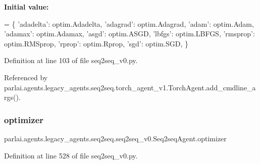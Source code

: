 {\bfseries Initial value\+:}
\begin{DoxyCode}
=  \{
        \textcolor{stringliteral}{'adadelta'}: optim.Adadelta,
        \textcolor{stringliteral}{'adagrad'}: optim.Adagrad,
        \textcolor{stringliteral}{'adam'}: optim.Adam,
        \textcolor{stringliteral}{'adamax'}: optim.Adamax,
        \textcolor{stringliteral}{'asgd'}: optim.ASGD,
        \textcolor{stringliteral}{'lbfgs'}: optim.LBFGS,
        \textcolor{stringliteral}{'rmsprop'}: optim.RMSprop,
        \textcolor{stringliteral}{'rprop'}: optim.Rprop,
        \textcolor{stringliteral}{'sgd'}: optim.SGD,
    \}
\end{DoxyCode}


Definition at line 103 of file seq2seq\+\_\+v0.\+py.



Referenced by parlai.\+agents.\+legacy\+\_\+agents.\+seq2seq.\+torch\+\_\+agent\+\_\+v1.\+Torch\+Agent.\+add\+\_\+cmdline\+\_\+args().

\mbox{\label{classparlai_1_1agents_1_1legacy__agents_1_1seq2seq_1_1seq2seq__v0_1_1Seq2seqAgent_ac6a5cc3b1faaae160f5c10318a7afcfd}} 
\subsubsection{\texorpdfstring{optimizer}{optimizer}}
{\footnotesize\ttfamily parlai.\+agents.\+legacy\+\_\+agents.\+seq2seq.\+seq2seq\+\_\+v0.\+Seq2seq\+Agent.\+optimizer}



Definition at line 528 of file seq2seq\+\_\+v0.\+py.



